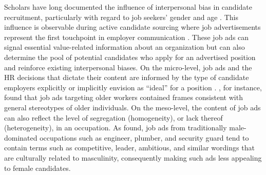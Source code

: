 \documentclass[preprint, review, 12pt]{elsarticle}
\begin{document}
Scholars have long documented the influence of interpersonal bias in candidate recruitment, particularly with regard to job seekers’ gender and age \citep{beattie_possible_2012, heilman_gender_2012, paleari_when_2019}. This influence is observable during active candidate sourcing where job advertisements represent the first touchpoint in employer communication \citep{RynesS.1989}. These job ads can signal essential value-related information about an organization \citep{de_cooman_portraying_2012} but can also determine the pool of potential candidates who apply for an advertised position and reinforce existing interpersonal biases. On the micro-level, job ads and the HR decisions that dictate their content are informed by the type of candidate employers explicitly or implicitly envision as “ideal” for a position \citep{kelly_gendered_2010}. \citet{van_selm_search_2021}, for instance, found that job ads targeting older workers contained frames consistent with general stereotypes of older individuals. On the meso-level, the content of job ads can also reflect the level of segregation (homogeneity), or lack thereof (heterogeneity), in an occupation. As \citet{gaucher_evidence_2011} found, job ads from traditionally male-dominated occupations such as engineer, plumber, and security guard tend to contain terms such as competitive, leader, ambitious, and similar wordings that are culturally related to masculinity, consequently making such ads less appealing to female candidates.


\end{document}

